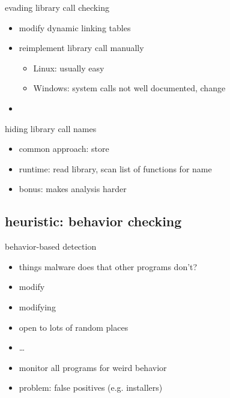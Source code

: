 \begin{frame}{evading library call checking}
    \begin{itemize}
    \item modify dynamic linking tables
    \item reimplement library call manually
        \begin{itemize}
        \item Linux: usually easy
        \item Windows: system calls not well documented, change
        \end{itemize}
    \item {}
    \end{itemize}
\end{frame}

\begin{frame}{hiding library call names}
    \begin{itemize}
    \item common approach: store 
    \item runtime: read library, scan list of functions for name
    \vspace{.5cm}
    \item bonus: makes analysis harder
    \end{itemize}
\end{frame}

\subsection{heuristic: behavior checking}


\begin{frame}{behavior-based detection}
    \begin{itemize}
    \item things malware does that other programs don't?
    \vspace{.5cm}
    \item<2-> modify 
    \item<2-> modifying 
    \item<2-> open  to lots of random places 
    \item<2-> \ldots
    \vspace{.5cm}
    \item<3-> monitor all programs for weird behavior
    \item<3-> problem: false positives (e.g. installers)
    \end{itemize}
\end{frame}

